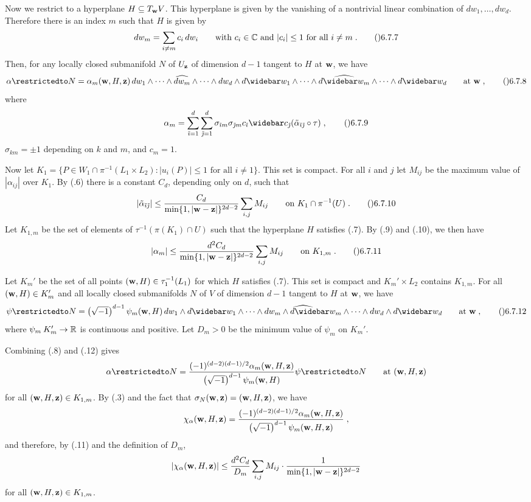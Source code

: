Now we restrict to a hyperplane $H\subseteq T_{\bold w}V$.  This hyperplane
is given by the vanishing of a nontrivial linear combination of
$dw_1,\dots,dw_d$.  Therefore there is an index $m$ such that $H$ is given by
$$dw_m=\sum_{i\ne m}c_i\,dw_i
  \qquad\text{with $c_i\in\Bbb C$ and $|c_i|\le1$ for all $i\ne m$}\;.
  \tag\06.7.7$$
Then, for any locally closed submanifold $N$ of $U_{\bold z}$ of dimension $d-1$
tangent to $H$ at $\bold w$, we have
$$\alpha\restrictedto N
  = \alpha_m(\bold w,H,\bold z)\,
    dw_1\wedge\dots\wedge\widehat{dw_m}\wedge\dots\wedge dw_d
    \wedge d\widebar w_1\wedge\dots\wedge\widehat{d\widebar w_m}
      \wedge\dots\wedge d\widebar w_d\qquad\text{at $\bold w$}\;,\tag\06.7.8$$
where
$$\alpha_m
  = \sum_{\tilde\imath=1}^d \sum_{\tilde\jmath=1}^d
    \sigma_{\tilde\imath m}\sigma_{\tilde\jmath m}
       c_{\tilde\imath}\widebar c_{\tilde\jmath}
       (\tilde\alpha_{\tilde\imath\tilde\jmath}\circ\tau)\;,\tag\06.7.9$$
$\sigma_{km}=\pm1$ depending on $k$ and $m$, and $c_m=1$.

Now let
$K_1=\{P\in W_1\cap\pi^{-1}(L_1\times L_2)
  : \text{$|u_i(P)|\le1$ for all $i\ne1$}\}$.  This set is compact.
For all $i$ and $j$ let $M_{ij}$ be the maximum value of $|\alpha_{ij}|$
over $K_1$.  By (.6) there is a constant $C_d$, depending only on $d$,
such that
$$|\tilde\alpha_{\tilde\imath\tilde\jmath}|
  \le \frac{C_d}{\min\{1,|\bold w-\bold z|\}^{2d-2}}\sum_{i,j}M_{ij}
  \qquad\text{on $K_1\cap\pi^{-1}(U)$}\;.\tag\06.7.10$$
Let $K_{1,m}$ be the set of elements of $\tau^{-1}(\pi(K_1)\cap U)$ such that
the hyperplane $H$ satisfies (.7).  By (.9) and (.10),
we then have
$$|\alpha_m|
  \le \frac{d^2C_d}{\min\{1,|\bold w-\bold z|\}^{2d-2}} \sum_{i,j}M_{ij}
  \qquad\text{on $K_{1,m}$}\;.\tag\06.7.11$$

Let $K_m'$ be the set of all points $(\bold w,H)\in\tau_1^{-1}(L_1)$
for which $H$ satisfies (.7).  This set is compact and $K_m'\times L_2$
contains $K_{1,m}$.
For all $(\bold w,H)\in K_m'$ and all locally closed submanifolds $N$ of $V$
of dimension $d-1$ tangent to $H$ at $\bold w$, we have
$$\psi\restrictedto N = \left(\sqrt{-1}\right)^{d-1}\psi_m(\bold w,H)\,
    dw_1\wedge d\widebar w_1\wedge\dots\wedge\widehat{dw_m\wedge d\widebar w_m}
    \wedge\dots\wedge dw_d\wedge d\widebar w_d \qquad\text{at $\bold w$}\;,
  \tag\06.7.12$$
where $\psi_m\:K_m'\to\Bbb R$ is continuous and positive.
Let $D_m>0$ be the minimum value of $\psi_m$ on $K_m'$.

Combining (.8) and (.12) gives
$$\alpha\restrictedto N
  = \frac{(-1)^{(d-2)(d-1)/2}\alpha_m(\bold w,H,\bold z)}
    {\left(\sqrt{-1}\right)^{d-1}\psi_m(\bold w,H)} \psi\restrictedto N
  \qquad\text{at $(\bold w,H,\bold z)$}$$
for all $(\bold w,H,\bold z)\in K_{1,m}$.  By (.3)
and the fact that $\sigma_N(\bold w,\bold z)=(\bold w,H,\bold z)$, we have
$$\chi_\alpha(\bold w,H,\bold z)
  = \frac{(-1)^{(d-2)(d-1)/2}\alpha_m(\bold w,H,\bold z)}
    {\left(\sqrt{-1}\right)^{d-1}\psi_m(\bold w,H,\bold z)}\;,$$
and therefore, by (.11) and the definition of $D_m$,
$$|\chi_\alpha(\bold w,H,\bold z)|
  \le \frac{d^2C_d}{D_m}\sum_{i,j}M_{ij}
    \cdot\frac1{\min\{1,|\bold w-\bold z|\}^{2d-2}}$$
for all $(\bold w,H,\bold z)\in K_{1,m}$.

